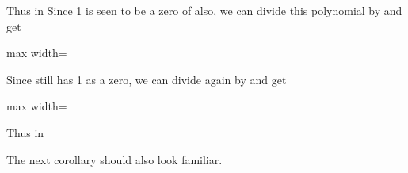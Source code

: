 \documentclass[11pt,oneside]{article}
\begin{document}
\begin{BookBody}
\noindent Thus  in  Since 1 is seen to be a zero of  also, we can divide this polynomial by  and get

\begin{center}\begin{adjustbox}{max width=\linewidth}\end{adjustbox}\end{center}

\noindent Since  still has 1 as a zero, we can divide again by  and get

\begin{center}\begin{adjustbox}{max width=\linewidth}\end{adjustbox}\end{center}

\noindent Thus  in  \BookEnd{\blacktriangle}

\noindent The next corollary should also look familiar.

\end{BookBody}

\BookNarrativetrue
\end{document}
